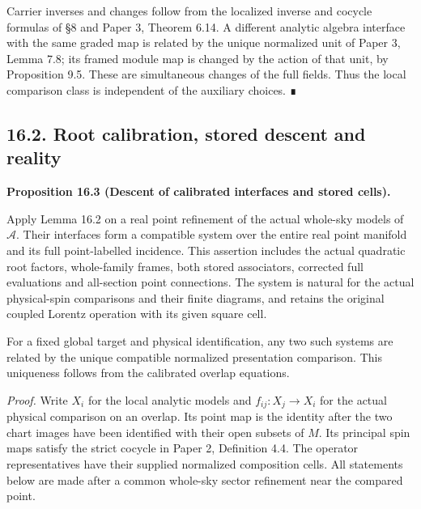 \documentclass[
  english,
  11pt,
  reqno]{amsart}
\makeatletter
\newcommand{\paperdisplaynext}{%
  \let\paper@savedstartsection\@startsection
  \def\@startsection##1##2##3##4##5##6{%
    \let\@startsection\paper@savedstartsection
    \@tempskipa ##5\relax
    \ifdim\@tempskipa<\z@
      \def\paper@afterskip{.35\baselineskip}%
    \else
      \def\paper@afterskip{##5}%
    \fi
    \@startsection{##1}{##2}{##3}{##4}{\paper@afterskip}{##6}}}
\newcommand{\paperdisplaysection}{\paperdisplaynext\subsection}
\newcommand{\pandocstatementheading}[1]{%
  \par\if@nobreak\else
    \addpenalty{\@beginparpenalty}%
    \addvspace{.5\baselineskip plus .2\baselineskip minus .2\baselineskip}%
  \fi
  {\normalfont\bfseries #1\par}%
  \nobreak\@afterindenttrue\@afterheading
}
\makeatother
\begin{document}
Carrier inverses and changes follow from the localized inverse and
cocycle formulas of §8 and Paper 3, Theorem 6.14. A different analytic
algebra interface with the same graded map is related by the unique
normalized unit of Paper 3, Lemma 7.8; its framed module map is changed
by the action of that unit, by Proposition 9.5. These are simultaneous
changes of the full fields. Thus the local comparison class is
independent of the auxiliary choices. ∎

\protect{}\label{sec:analytic-interface-descent}
\paperdisplaysection{16.2. Root calibration, stored descent and
reality}\label{root-calibration-stored-descent-and-reality}
\pandocstatementheading{\protect{}\label{prop:analytic-calibrated-interface-descent}Proposition 16.3 (Descent of calibrated interfaces and stored cells).}

Apply Lemma 16.2 on a real point refinement of the actual whole-sky
models of \(\mathcal A\). Their interfaces form a compatible system over
the entire real point manifold and its full point-labelled incidence.
This assertion includes the actual quadratic root factors, whole-family
frames, both stored associators, corrected full evaluations and
all-section point connections. The system is natural for the actual
physical-spin comparisons and their finite diagrams, and retains the
original coupled Lorentz operation with its given square cell.

For a fixed global target and physical identification, any two such
systems are related by the unique compatible normalized presentation
comparison. This uniqueness follows from the calibrated overlap
equations.

\emph{Proof.} Write \(X_i\) for the local analytic models and
\(f_{ij}:X_j\to X_i\) for the actual physical comparison on an overlap.
Its point map is the identity after the two chart images have been
identified with their open subsets of \(M\). Its principal spin maps
satisfy the strict cocycle in Paper 2, Definition 4.4. The operator
representatives have their supplied normalized composition cells. All
statements below are made after a common whole-sky sector refinement
near the compared point.
\end{document}
